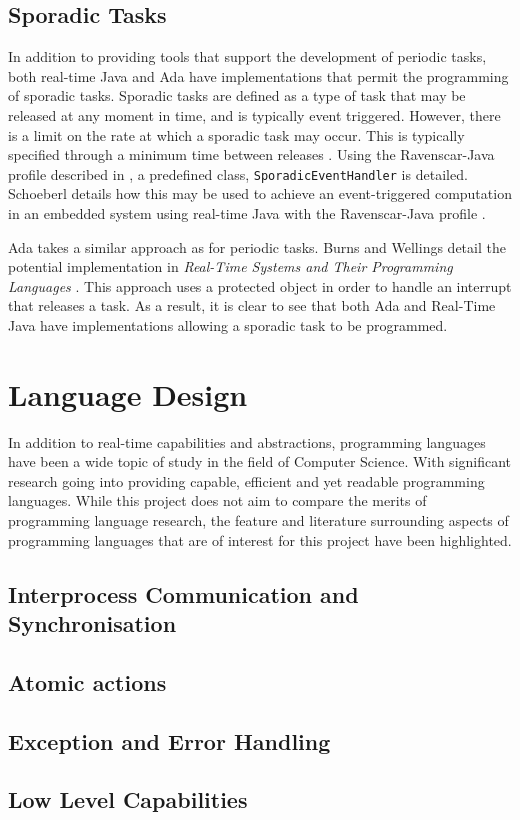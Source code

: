 \subsection{Sporadic Tasks}
In addition to providing tools that support the development of periodic tasks, 
both real-time Java and Ada have implementations that permit the 
programming of sporadic tasks. 
Sporadic tasks are defined as a type of task that may be released at any moment in 
time, and is typically event triggered. However, there is a limit on the rate at 
which a sporadic task may occur. This is typically specified through a minimum 
time between releases \cite{11111101}. 
Using the Ravenscar-Java profile described in \cite{ravenscar-java}, a predefined 
class, \texttt{SporadicEventHandler} is detailed. Schoeberl details how this may 
be used to achieve an event-triggered computation in an embedded system using 
real-time Java with the Ravenscar-Java profile \cite{1300334}. 
\par\bigskip\noindent
Ada takes a similar approach as for periodic tasks. Burns and Wellings detail the 
potential implementation in \emph{Real-Time Systems and Their Programming Languages}
\cite[p341]{real-time-systems}. 
This approach uses a protected object in order to handle an interrupt that releases a 
task.
As a result, it is clear to see that both Ada and Real-Time Java have implementations 
allowing a sporadic task to be programmed. 

\section{Language Design}
In addition to real-time capabilities and abstractions, programming languages have 
been a wide topic of study in the field of Computer Science. With significant 
research going into providing capable, efficient and yet readable programming 
languages. While this project does not aim to compare the merits of programming 
language research, the feature and literature surrounding aspects of programming 
languages that are of interest for this project have been highlighted. 

\subsection{Interprocess Communication and Synchronisation} %


\subsection{Atomic actions} %
\subsection{Exception and Error Handling} %
\subsection{Low Level Capabilities} %

